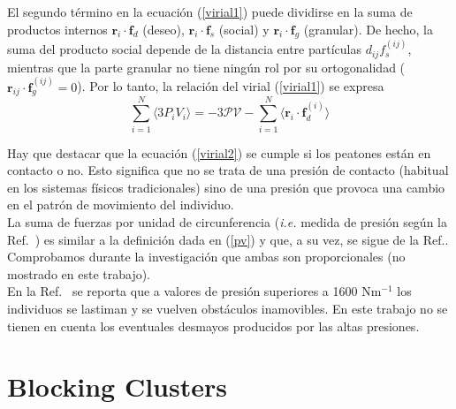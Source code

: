 El segundo término en la ecuación (\ref{virial1}) puede dividirse en la suma de productos internos $\mathbf{r}_i\cdot\mathbf{f}_d$ (deseo), 
$\mathbf{r}_i\cdot\mathbf{f}_s$ (social) y $\mathbf{r}_i\cdot\mathbf{f}_g$ (granular). De hecho, la suma del producto social depende de la distancia entre partículas $d_{ij}f_s^{(ij)}$, mientras que la parte granular no tiene ningún rol por su ortogonalidad ($\mathbf{r}_{ij}\cdot\mathbf{f}_g^{(ij)}=0$). Por lo tanto, la relación del virial (\ref{virial1}) se expresa \\  

\begin{equation}
 \displaystyle\sum_{i=1}^N\langle3P_iV_i 
\rangle=-3\mathcal{PV} -\displaystyle\sum_{i=1}^N \langle
\mathbf{r}_i\cdot\mathbf{f}_d^{(i)}\rangle\label{virial2}
\end{equation}

Hay que destacar que la ecuación (\ref{virial2}) se cumple si los peatones están en contacto o no. Esto significa que no se trata de una presión de contacto (habitual en los sistemas físicos tradicionales) sino de una presión que provoca una cambio en el patrón de movimiento del individuo.\\

La suma de fuerzas por unidad de circunferencia (\textit{i.e.} medida de presión según la Ref.~\cite{Helbing1}) es similar a la definición dada en (\ref{pv}) y que, a su vez, se sigue de la Ref.\cite{lion}. Comprobamos durante la investigación que ambas son proporcionales (no mostrado en este trabajo).\\   

En la Ref.~\cite{Helbing1} se reporta que a valores de presión superiores a 1600 Nm$^{-1}$ los individuos se lastiman y se vuelven obstáculos inamovibles. En este trabajo no se tienen en cuenta los eventuales desmayos producidos por las altas presiones. 

\section{Blocking Clusters}

